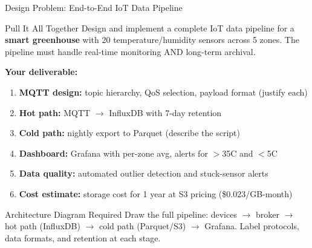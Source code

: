 \documentclass[aspectratio=169,11pt]{beamer}
\begin{document}
\begin{frame}{Design Problem: End-to-End IoT Data Pipeline}
    \begin{block}{Pull It All Together}
        Design and implement a complete IoT data pipeline for a \textbf{smart greenhouse} with 20 temperature/humidity sensors across 5 zones. The pipeline must handle real-time monitoring AND long-term archival.
    \end{block}

    \vspace{0.2cm}
    \textbf{Your deliverable:}
    \begin{enumerate}
        \item \textbf{MQTT design:} topic hierarchy, QoS selection, payload format (justify each)
        \item \textbf{Hot path:} MQTT $\rightarrow$ InfluxDB with 7-day retention
        \item \textbf{Cold path:} nightly export to Parquet (describe the script)
        \item \textbf{Dashboard:} Grafana with per-zone avg, alerts for $>$35\textdegree C and $<$5\textdegree C
        \item \textbf{Data quality:} automated outlier detection and stuck-sensor alerts
        \item \textbf{Cost estimate:} storage cost for 1 year at S3 pricing (\$0.023/GB-month)
    \end{enumerate}

    \vspace{0.1cm}
    \begin{alertblock}{Architecture Diagram Required}
        Draw the full pipeline: devices $\rightarrow$ broker $\rightarrow$ hot path (InfluxDB) $\rightarrow$ cold path (Parquet/S3) $\rightarrow$ Grafana. Label protocols, data formats, and retention at each stage.
    \end{alertblock}
\end{frame}
\end{document}
